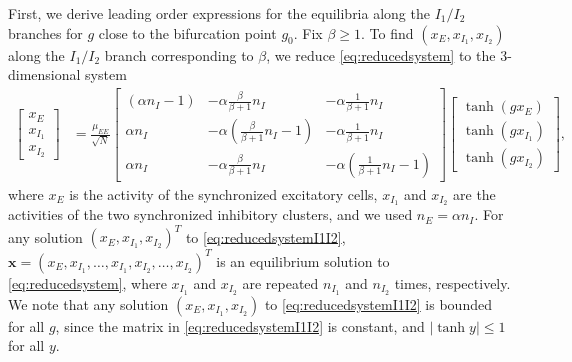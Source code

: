 \documentclass[reqno]{siamonline190516}
\newcommand{\xvec}{\mathbf{x}}
\begin{document}
First, we derive leading order expressions for the equilibria along the $I_1/I_2$ branches for $g$ close to the bifurcation point $g_0$. Fix $\beta \geq 1$. To find $(x_E, x_{I_1}, x_{I_2})$ along the $I_1/I_2$ branch corresponding to $\beta$, we reduce \cref{eq:reducedsystem} to the 3-dimensional system
\begin{equation}\label{eq:reducedsystemI1I2}
 \begin{aligned}
 \begin{bmatrix} x_E\\x_{I_1}\\x_{I_2}\end{bmatrix} 
 &= \frac{\mu_{EE}}{\sqrt{N}} 
 \begin{bmatrix} (\alpha n_I - 1) & -\alpha \frac{\beta}{\beta+1} n_I & - \alpha \frac{1}{\beta+1} n_I  \\
    \alpha n_I  & -\alpha \left(\frac{\beta}{\beta+1} n_I-1\right) & - \alpha \frac{1}{\beta+1} n_I  \\
    \alpha n_I & -\alpha \frac{\beta}{\beta+1} n_I & -\alpha \left(\frac{1}{\beta+1} n_I-1\right)
 \end{bmatrix}
 \begin{bmatrix} \tanh(g x_E) \\\tanh ( g x_{I_1} ) \\\tanh(g x_{I_2})\end{bmatrix},
 \end{aligned}
\end{equation}
where $x_E$ is the activity of the synchronized excitatory cells, $x_{I_1}$ and $x_{I_2}$ are the activities of the two synchronized inhibitory clusters, and we used $n_E = \alpha n_I$. For any solution $(x_E, x_{I_1}, x_{I_2})^T$ to \cref{eq:reducedsystemI1I2}, $\xvec = (x_E, x_{I_1}, \dots, x_{I_1}, x_{I_2}, \dots, x_{I_2})^T$ is an equilibrium solution to \cref{eq:reducedsystem}, where $x_{I_1}$ and $x_{I_2}$ are repeated $n_{I_1}$ and $n_{I_2}$ times, respectively. We note that any solution $(x_E, x_{I_1}, x_{I_2})$ to \cref{eq:reducedsystemI1I2} is bounded for all $g$, since the matrix in \cref{eq:reducedsystemI1I2} is constant, and $|\tanh y| \leq 1$ for all $y$. 
\end{document}

